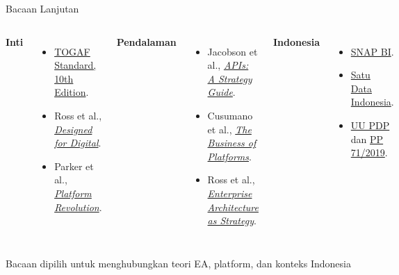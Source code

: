 \documentclass[aspectratio=169, table]{beamer}
\newcommand{\takeaway}[1]{%
  \vspace{4pt}
  {\footnotesize #1}
}
\begin{document}
\begin{frame}{Bacaan Lanjutan}
  \vspace{8pt}
	  \begin{columns}[t]
	    \textbf{Inti}
	    \vspace{4pt}
	    \begin{itemize}
	      \item \href{https://www.opengroup.org/togaf-standard-10th-edition-downloads}{TOGAF Standard, 10th Edition}.
	      \item Ross et al., \href{https://mitpress.mit.edu/9780262042888/designed-for-digital/}{\emph{Designed for Digital}}.
	      \item Parker et al., \href{https://wwnorton.com/books/Platform-Revolution/}{\emph{Platform Revolution}}.
	    \end{itemize}

	    \textbf{Pendalaman}
	    \vspace{4pt}
	    \begin{itemize}
	      \item Jacobson et al., \href{https://www.oreilly.com/library/view/apis-a-strategy/9781449321628/}{\emph{APIs: A Strategy Guide}}.
	      \item Cusumano et al., \href{https://www.harpercollins.com/products/the-business-of-platforms-michael-a-cusumanoannabelle-gawerdavid-b-yoffie}{\emph{The Business of Platforms}}.
	      \item Ross et al., \href{https://store.hbr.org/product/enterprise-architecture-as-strategy-creating-a-foundation-for-business-execution/8398}{\emph{Enterprise Architecture as Strategy}}.
	    \end{itemize}

	    \textbf{Indonesia}
	    \vspace{4pt}
	    \begin{itemize}
	      \item \href{https://www.bi.go.id/id/layanan/Standar/SNAP/default.aspx}{SNAP BI}.
	      \item \href{https://data.go.id/}{Satu Data Indonesia}.
	      \item \href{https://peraturan.bpk.go.id/Details/229798/uu-no-27-tahun-2022}{UU PDP} dan \href{https://www.peraturan.go.id/id/pp-no-71-tahun-2019}{PP 71/2019}.
	    \end{itemize}
	  \end{columns}

  \takeaway{Bacaan dipilih untuk menghubungkan teori EA, platform, dan konteks Indonesia}
\end{frame}
\end{document}
